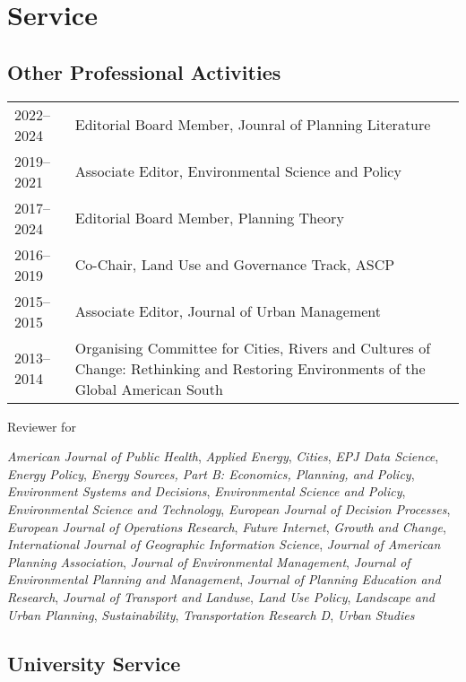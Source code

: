 \documentclass[11pt,a4paper,]{awesome-cv}
\begin{document}
\section{Service}\label{service}

\subsection{Other Professional
Activities}\label{other-professional-activities}

\begin{tabular}{lp{11.3cm}}
  2022--2024 & Editorial Board Member, Jounral of Planning Literature \\ 
  2019--2021 & Associate Editor, Environmental Science and Policy \\ 
  2017--2024 & Editorial Board Member, Planning Theory \\ 
  2016--2019 & Co-Chair, Land Use and Governance Track, ASCP \\ 
  2015--2015 & Associate Editor, Journal of Urban Management \\ 
  2013--2014 & Organising Committee for Cities, Rivers and Cultures of Change: Rethinking and Restoring Environments of the Global American South \\ 
  \end{tabular}

Reviewer for

\emph{American Journal of Public Health}, \emph{Applied Energy},
\emph{Cities}, \emph{EPJ Data Science}, \emph{Energy Policy},
\emph{Energy Sources, Part B: Economics, Planning, and Policy},
\emph{Environment Systems and Decisions},
\emph{Environmental Science and Policy},
\emph{Environmental Science and Technology},
\emph{European Journal of Decision Processes},
\emph{European Journal of Operations Research}, \emph{Future Internet},
\emph{Growth and Change},
\emph{International Journal of Geographic Information Science},
\emph{Journal of American Planning Association},
\emph{Journal of Environmental Management},
\emph{Journal of Environmental Planning and Management},
\emph{Journal of Planning Education and Research},
\emph{Journal of Transport and Landuse}, \emph{Land Use Policy},
\emph{Landscape and Urban Planning}, \emph{Sustainability},
\emph{Transportation Research D}, \emph{Urban Studies}

\subsection{University Service}\label{university-service}
\end{document}
